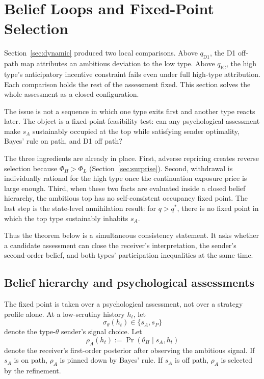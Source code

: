 \section{Belief Loops and Fixed-Point Selection}
\label{sec:belief-loop}

Section~\ref{sec:dynamic} produced two local comparisons. Above \(q_{\mathrm{D1}}\), the D1 off-path map attributes an ambitious deviation to the low type. Above \(q_{\mathrm{IC}}\), the high type's anticipatory incentive constraint fails even under full high-type attribution. Each comparison holds the rest of the assessment fixed. This section solves the whole assessment as a closed configuration.

The issue is not a sequence in which one type exits first and another type reacts later. The object is a fixed-point feasibility test: can any psychological assessment make \(s_A\) sustainably occupied at the top while satisfying sender optimality, Bayes' rule on path, and D1 off path?

The three ingredients are already in place. First, adverse repricing creates reverse selection because \(\Phi_H>\Phi_L\) (Section~\ref{sec:surprise}). Second, withdrawal is individually rational for the high type once the continuation exposure price is large enough. Third, when these two facts are evaluated inside a closed belief hierarchy, the ambitious top has no self-consistent occupancy fixed point. The last step is the state-level annihilation result: for \(q>q^*\), there is no fixed point in which the top type sustainably inhabits \(s_A\).

Thus the theorem below is a simultaneous consistency statement. It asks whether a candidate assessment can close the receiver's interpretation, the sender's second-order belief, and both types' participation inequalities at the same time.

\subsection{Belief hierarchy and psychological assessments}
\label{subsec:belief-hierarchy}

The fixed point is taken over a psychological assessment, not over a strategy profile alone. At a low-scrutiny history \(h_t\), let
\[
\sigma_\theta(h_t)\in\{s_A,s_P\}
\]
denote the type-\(\theta\) sender's signal choice. Let
\[
\rho_A(h_t):=\Pr(\theta_H\mid s_A,h_t)
\]
denote the receiver's first-order posterior after observing the ambitious signal. If \(s_A\) is on path, \(\rho_A\) is pinned down by Bayes' rule. If \(s_A\) is off path, \(\rho_A\) is selected by the refinement.

